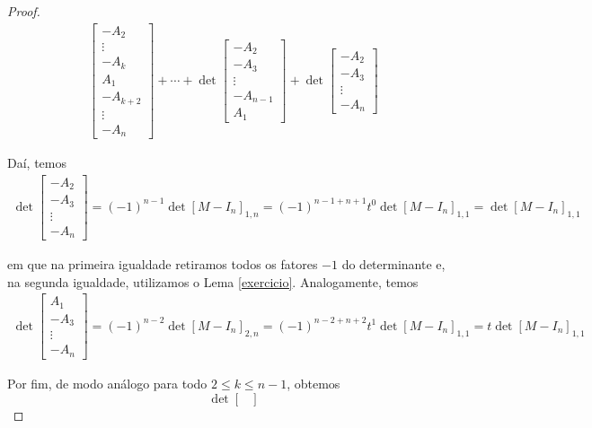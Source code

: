\documentclass[a4paper,portuguese,11pt,twoside, leqno]{book}
\theoremstyle{definition}
\begin{document}
\begin{proof}
\begin{align*}
\begin{bmatrix}
		-A_2 \\
		\vdots\\
		-A_k \\
		A_1\\
		-A_{k+2}\\
		\vdots\\
		-A_n
		\end{bmatrix} +\cdots + 
		\det\begin{bmatrix}
		-A_2\\
		-A_3 \\
		\vdots\\
		-A_{n-1}\\
		A_1
		\end{bmatrix}+\det\begin{bmatrix}
		-A_2\\
		-A_3\\
		\vdots\\
		-A_n
		\end{bmatrix}
		\end{align*}
		\par\vspace{0.3cm} Daí, temos
		\begin{align*}
		\det\begin{bmatrix}
		-A_2\\
		-A_3\\
		\vdots \\
		-A_n
		\end{bmatrix} = (-1)^{n-1}\det[M-I_n]_{1,n} = (-1)^{n-1+n+1}t^0\det[M - I_n]_{1,1} = \det[M-I_n]_{1,1}
		\end{align*}
		\par\vspace{0.3cm} em que na primeira igualdade retiramos todos os fatores $-1$ do determinante e, na segunda igualdade, utilizamos o Lema \eqref{exercicio}. Analogamente, temos
		\begin{align*}
		\det\begin{bmatrix}
		A_1\\
		-A_3\\
		\vdots\\
		-A_n
		\end{bmatrix} = (-1)^{n-2}\det[M-I_n]_{2,n} = (-1)^{n-2+n+2}t^1\det[M - I_n]_{1,1} = t\det[M - I_n]_{1,1}
		\end{align*}
		\par\vspace{0.3cm} Por fim, de modo análogo para todo $2\leq k\leq n-1$, obtemos
		\begin{equation*}
		\det\begin{bmatrix}

\end{bmatrix}
\end{equation*}
\end{proof}
\end{document}

